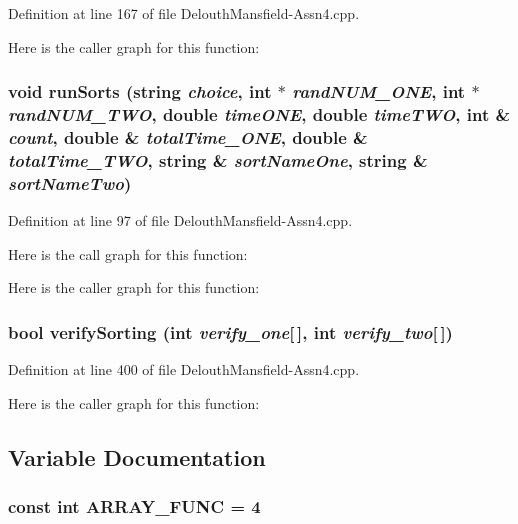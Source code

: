 Definition at line 167 of file DelouthMansfield-\/Assn4.cpp.



Here is the caller graph for this function:

\hypertarget{_delouth_mansfield-_assn4_8cpp_ab8afa82cf87b47530bd2505812a9fc82}{
\subsubsection[{runSorts}]{\setlength{\rightskip}{0pt plus 5cm}void runSorts (string {\em choice}, \/  int $\ast$ {\em randNUM\_\-ONE}, \/  int $\ast$ {\em randNUM\_\-TWO}, \/  double {\em timeONE}, \/  double {\em timeTWO}, \/  int \& {\em count}, \/  double \& {\em totalTime\_\-ONE}, \/  double \& {\em totalTime\_\-TWO}, \/  string \& {\em sortNameOne}, \/  string \& {\em sortNameTwo})}}
\label{_delouth_mansfield-_assn4_8cpp_ab8afa82cf87b47530bd2505812a9fc82}


Definition at line 97 of file DelouthMansfield-\/Assn4.cpp.



Here is the call graph for this function:



Here is the caller graph for this function:

\hypertarget{_delouth_mansfield-_assn4_8cpp_ae2cf0cca1e089e83ae98750b96b8cf11}{
\subsubsection[{verifySorting}]{\setlength{\rightskip}{0pt plus 5cm}bool verifySorting (int {\em verify\_\-one}\mbox{[}$\,$\mbox{]}, \/  int {\em verify\_\-two}\mbox{[}$\,$\mbox{]})}}
\label{_delouth_mansfield-_assn4_8cpp_ae2cf0cca1e089e83ae98750b96b8cf11}


Definition at line 400 of file DelouthMansfield-\/Assn4.cpp.



Here is the caller graph for this function:



\subsection{Variable Documentation}
\hypertarget{_delouth_mansfield-_assn4_8cpp_a3b95dd60d5c45f7cc3733769f3d54868}{
\subsubsection[{ARRAY\_\-FUNC}]{\setlength{\rightskip}{0pt plus 5cm}const int {\bf ARRAY\_\-FUNC} = 4}}
\label{_delouth_mansfield-_assn4_8cpp_a3b95dd60d5c45f7cc3733769f3d54868}


